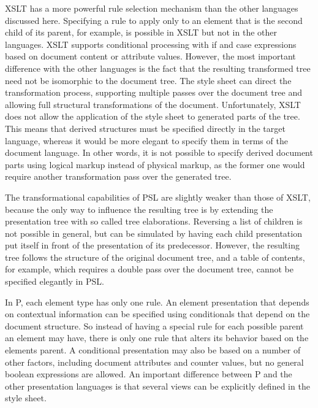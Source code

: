  XSLT has a more powerful rule selection mechanism than the other languages discussed here. Specifying a rule to apply only to an element that is the second child of its parent, for example, is possible in XSLT but not in the other languages. XSLT supports conditional processing with if and case expressions based on document content or attribute values. However, the most important difference with the other languages is the fact that the resulting transformed tree need not be isomorphic to the document tree. The style sheet can direct the transformation process, supporting multiple passes over the document tree and allowing full structural transformations of the document. Unfortunately, XSLT does not allow the application of the style sheet to generated parts of the tree. This means that derived structures must be specified directly in the target language, whereas it would be more elegant to specify them in terms of the document language. In other words, it is not possible to specify derived document parts using logical markup instead of physical markup, as the former one would require another transformation pass over the generated tree. 

 The transformational capabilities of PSL are slightly weak\-er than those of XSLT, because the only way to influence the resulting tree is by extending the presentation tree with so called tree elaborations. Reversing a list of children is not possible in general, but can be simulated by having each child presentation put itself in front of the presentation of its predecessor. However, the resulting tree follows the structure of the original document tree, and a table of contents, for example, which requires a double pass over the document tree, cannot be specified elegantly in PSL.

 In P, each element type has only one rule. An element presentation that depends on contextual information can be specified using conditionals that depend on the document structure. So instead of having a special rule for each possible parent an element may have, there is only one rule that alters its behavior based on the elements parent. A conditional presentation may also be based on a number of other factors, including document attributes and counter values, but no general boolean expressions are allowed. An important difference between P and the other presentation languages is that several views can be explicitly defined in the style sheet. 

